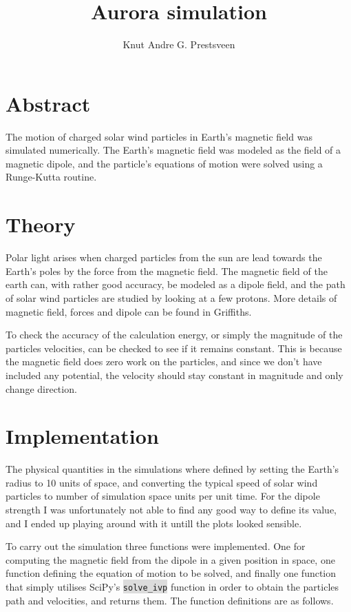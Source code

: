 \documentclass{article}
\title{Aurora simulation}
\author{Knut Andre G. Prestsveen}
\begin{document}
\maketitle
\section{Abstract}
The motion of charged solar wind particles in Earth's magnetic field was simulated numerically. The Earth's magnetic field was modeled as the field of a magnetic dipole, and the particle's equations of motion were solved using a Runge-Kutta routine.

\section{Theory}
\label{theory}
Polar light arises when charged particles from the sun are lead towards the Earth's poles by the force from the magnetic field. The magnetic field of the earth can, with rather good accuracy, be modeled as a dipole field, and the path of solar wind particles are studied by looking at a few protons. More details of magnetic field, forces and dipole can be found in Griffiths\cite{griffiths}.

To check the accuracy of the calculation energy, or simply the magnitude of the particles velocities, can be checked to see if it remains constant. This is because the magnetic field does zero work on the particles, and since we don't have included any potential, the velocity should stay constant in magnitude and only change direction.

\section{Implementation}
The physical quantities in the simulations where defined by setting the Earth's radius to 10 units of space, and converting the typical speed of solar wind particles to number of simulation space units per unit time. For the dipole strength I was unfortunately not able to find any good way to define its value, and I ended up playing around with it untill the plots looked sensible.

To carry out the simulation three functions were implemented. One for computing the magnetic field from the dipole in a given position in space, one function defining the equation of motion to be solved, and finally one function that simply utilises SciPy's \colorbox{gainsboro}{\lstinline{solve_ivp}} function in order to obtain the particles path and velocities, and returns them. The function definitions are as follows.
\end{document}
